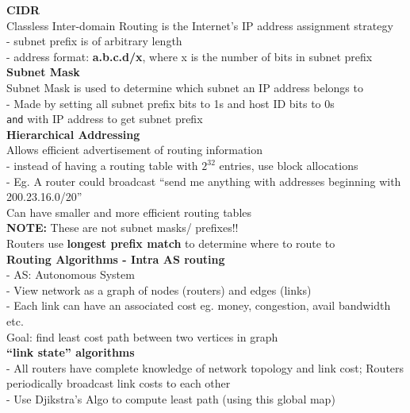 \documentclass[10pt, a4paper]{article}
\newcommand{\highlight}[1]{{\color{red}\textbf{#1}}}
\newcommand{\red}[1]{{\color{red}#1}}
\begin{document}
\begin{multicols*}{3}
		\textbf{CIDR}\\
		Classless Inter-domain Routing is the Internet's IP address assignment strategy\\
		- subnet prefix is of arbitrary length\\
		- address format: \highlight{a.b.c.d/x}, where x is the number of bits in subnet prefix\\

		\textbf{Subnet Mask}\\
		\red{Subnet Mask} is used to determine which subnet an IP address belongs to\\
		- Made by setting all subnet prefix bits to 1s and host ID bits to 0s\\
		\texttt{and} with IP address to get subnet prefix\\

		\textbf{Hierarchical Addressing}\\
		Allows efficient advertisement of routing information\\
		- instead of having a routing table with $2^{32}$ entries, use block allocations\\
		- Eg. A router could broadcast ``send me anything with addresses beginning with 200.23.16.0/20''\\
		Can have smaller and more efficient routing tables\\
		\highlight{NOTE:} These are not subnet masks/ prefixes!!\\
		Routers use \highlight{longest prefix match} to determine where to route to\\

		\textbf{Routing Algorithms - Intra AS routing}\\
		- AS: Autonomous System\\
		- View network as a graph of nodes (routers) and edges (links)\\
		- Each link can have an associated cost eg. money, congestion, avail bandwidth etc.\\
		\red{Goal:} find least cost path between two vertices in graph\\

		\textbf{``link state'' algorithms}\\
		- All routers have complete knowledge of network topology and link cost; Routers periodically broadcast link costs to each other\\
		- Use Djikstra's Algo to compute least path (using this global map)\\


\end{multicols*}
\end{document}
